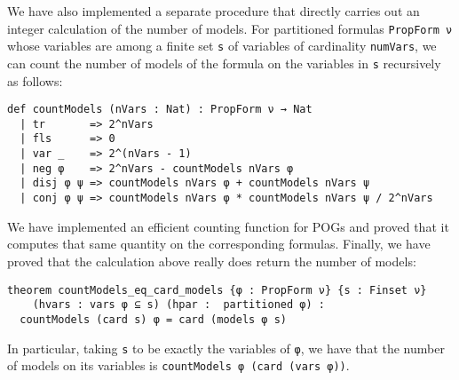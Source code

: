 We have also implemented a separate procedure that directly carries out an integer
calculation of the number of models.
For partitioned formulas \lstinline{PropForm ν} whose
variables are among a finite set \lstinline{s} of variables of cardinality \lstinline{numVars},
we can count the number of models of the formula on the variables in \lstinline{s}
recursively as follows:
\begin{lstlisting}
def countModels (nVars : Nat) : PropForm ν → Nat
  | tr       => 2^nVars
  | fls      => 0
  | var _    => 2^(nVars - 1)
  | neg φ    => 2^nVars - countModels nVars φ
  | disj φ ψ => countModels nVars φ + countModels nVars ψ
  | conj φ ψ => countModels nVars φ * countModels nVars ψ / 2^nVars
\end{lstlisting}
We have implemented an efficient counting function for POGs and proved that
it computes that same quantity on the corresponding formulas.
Finally,
we have proved that the calculation above really does
return the number of models:
\begin{lstlisting}
theorem countModels_eq_card_models {φ : PropForm ν} {s : Finset ν}
    (hvars : vars φ ⊆ s) (hpar :  partitioned φ) :
  countModels (card s) φ = card (models φ s)
\end{lstlisting}
In particular, taking \lstinline{s} to be exactly the variables of \lstinline{φ},
we have that the number of models on its variables is \lstinline{countModels φ (card (vars φ))}.

